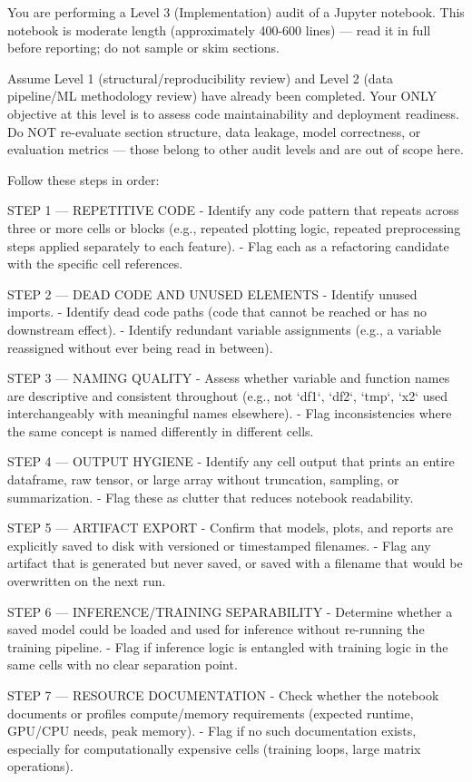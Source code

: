 \documentclass[11pt, a4paper]{article}
\begin{document}
{\small\sffamily
You are performing a Level 3 (Implementation) audit of a Jupyter notebook.
This notebook is moderate length (approximately 400-600 lines) — read it
in full before reporting; do not sample or skim sections.

Assume Level 1 (structural/reproducibility review) and Level 2
(data pipeline/ML methodology review) have already been completed.
Your ONLY objective at this level is to assess code maintainability and
deployment readiness. Do NOT re-evaluate section structure, data leakage,
model correctness, or evaluation metrics — those belong to other audit
levels and are out of scope here.

Follow these steps in order:

STEP 1 — REPETITIVE CODE
- Identify any code pattern that repeats across three or more cells or
blocks (e.g., repeated plotting logic, repeated preprocessing steps
applied separately to each feature).
- Flag each as a refactoring candidate with the specific cell references.

STEP 2 — DEAD CODE AND UNUSED ELEMENTS
- Identify unused imports.
- Identify dead code paths (code that cannot be reached or has no
downstream effect).
- Identify redundant variable assignments (e.g., a variable reassigned
without ever being read in between).

STEP 3 — NAMING QUALITY
- Assess whether variable and function names are descriptive and
consistent throughout (e.g., not `df1`, `df2`, `tmp`, `x2` used
interchangeably with meaningful names elsewhere).
- Flag inconsistencies where the same concept is named differently in
different cells.

STEP 4 — OUTPUT HYGIENE
- Identify any cell output that prints an entire dataframe, raw tensor,
or large array without truncation, sampling, or summarization.
- Flag these as clutter that reduces notebook readability.

STEP 5 — ARTIFACT EXPORT
- Confirm that models, plots, and reports are explicitly saved to disk
with versioned or timestamped filenames.
- Flag any artifact that is generated but never saved, or saved with a
filename that would be overwritten on the next run.

STEP 6 — INFERENCE/TRAINING SEPARABILITY
- Determine whether a saved model could be loaded and used for
inference without re-running the training pipeline.
- Flag if inference logic is entangled with training logic in the same
cells with no clear separation point.

STEP 7 — RESOURCE DOCUMENTATION
- Check whether the notebook documents or profiles compute/memory
requirements (expected runtime, GPU/CPU needs, peak memory).
- Flag if no such documentation exists, especially for
computationally expensive cells (training loops, large matrix
operations).

}
\end{document}
